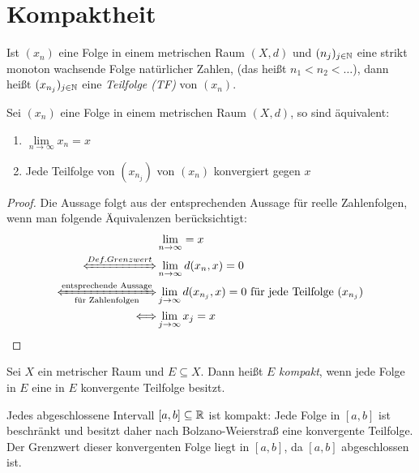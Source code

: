 \cleardoublepage
\section{Kompaktheit}

\begin{Definition}%
	Ist $(x_n)$ eine Folge in einem metrischen Raum $(X,d)$ und $(n_j)_{j \in \mathbb{N}}$ 
	eine strikt monoton wachsende Folge natürlicher Zahlen, (das heißt \mbox{$n_1 < n_2 
	< \hdots$}), dann heißt $(x_{n_j})_{j \in \mathbb{N}}$ eine \emph{Teilfolge (TF)} von 
	$(x_n)$.
\end{Definition}

\begin{Proposition}\label{vl_25_prop_1}%
	Sei $(x_n)$ eine Folge in einem metrischen Raum $(X,d)$, so sind äquivalent:
	\begin{enumerate}
		\item \label{vl_25_stp_1}$\lim\limits_{n \rightarrow \infty}{x_n} = x$
		\item \label{vl_25_stp_2} Jede Teilfolge von $(x_{n_j})$ von $(x_n)$ 
			konvergiert gegen $x$
	\end{enumerate}
\end{Proposition}

\begin{proof}
	Die Aussage folgt aus der entsprechenden Aussage für reelle Zahlenfolgen, wenn 
	man folgende Äquivalenzen berücksichtigt:
	\begin{align*}
		&\lim\limits_{n \rightarrow \infty} = x \\
		\xLeftrightarrow{Def. Grenzwert} &
			\lim\limits_{n\rightarrow\infty}d(x_n,x)=0 \\
		\xLeftrightarrow[\text{für Zahlenfolgen}]{\text{entsprechende Aussage}} 
			& \lim\limits_{j\rightarrow \infty}d(x_{n_j},x) = 0 
			\text{ für jede Teilfolge } (x_{n_j}) \\
		\Longleftrightarrow & \lim\limits_{j \rightarrow \infty} x_j = x
	\end{align*}
\end{proof}

\begin{Definition}%
	Sei $X$ ein metrischer Raum und $E \subseteq X$. Dann heißt $E$ \emph{kompakt}, 
	wenn jede Folge in $E$ eine in $E$ konvergente Teilfolge besitzt.
\end{Definition}

\begin{Beispiel}	
	Jedes abgeschlossene Intervall $[a,b] \subseteq \mathbb{R}$ ist kompakt: 
	Jede Folge in $[a,b]$ ist beschränkt und besitzt daher nach Bolzano-Weierstraß 
	eine konvergente Teilfolge. Der Grenzwert dieser konvergenten Folge liegt in 
	$[a,b]$, da $[a,b]$ abgeschlossen ist.
\end{Beispiel}
 
